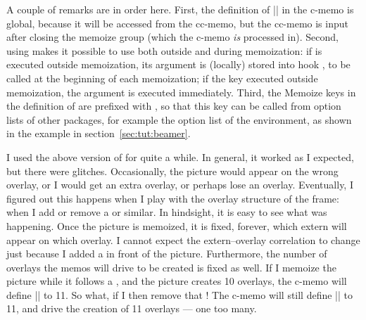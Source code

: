 \documentclass[a4paper,11pt]{article}
\begin{document}

A couple of remarks are in order here.  First, the definition of
|\mmzBeamerOverlays| in the c-memo is global, because it will be accessed from
the cc-memo, but the cc-memo is input after closing the memoize group (which
the c-memo \emph{is} processed in).  Second, using  makes it possible to use  both outside and
during memoization: if  is executed outside
memoization, its argument is (locally) stored into hook
, to be called at the beginning of each
memoization; if the key executed outside memoization, the argument is executed
immediately.  Third, the Memoize keys in the definition of 
are prefixed with , so that this key can be called from
 option lists of other packages, for example the option list of
the  environment, as shown in the example in
section~\ref{sec:tut:beamer}.

I used the above version of  for quite a while.  In
general, it worked as I expected, but there were glitches.  Occasionally, the
picture would appear on the wrong overlay, or I would get an extra overlay, or
perhaps lose an overlay.  Eventually, I figured out this happens when I play
with the overlay structure of the frame: when I add or remove a  or
similar.  In hindsight, it is easy to see what was happening.  Once the picture
is memoized, it is fixed, forever, which extern will appear on which overlay.
I cannot expect the extern--overlay correlation to change just because I added
a  in front of the picture.  Furthermore, the number of overlays the
memos will drive to be created is fixed as well.  If I memoize the picture
while it follows a , and the picture creates 10 overlays, the c-memo
will define |\mmzBeamerOverlays| to 11.  So what, if I then remove that
!  The c-memo will still define |\mmzBeamerOverlays| to 11, and drive
the creation of 11 overlays --- one too many.
\end{document}
